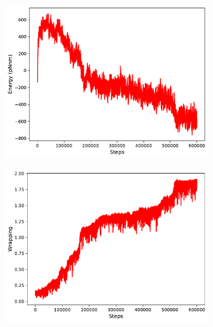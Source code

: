 \documentclass[a4paper,10pt]{article}
\begin{document}
\begin{figure}[htbp]
\centering
\begin{subfigure}{.49\textwidth}
\includegraphics[width=\textwidth]{hist_energy.pdf}
\caption{}
\label{fig:hist_en}
\end{subfigure}
\begin{subfigure}{.49\textwidth}
\includegraphics[width=\textwidth]{hist_wrapping.pdf}
\caption{}
\label{fig:hist_wr}
\end{subfigure}
\begin{subfigure}{.49\textwidth}

\end{subfigure}
\end{figure}
\end{document}
